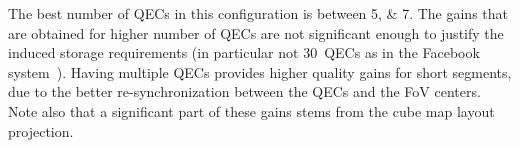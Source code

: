 The best number of \acp{QEC} in this configuration is between
\numlist{5;7}. The gains that are obtained for higher number of
\acp{QEC} are not significant enough to justify the induced storage
requirements (in particular not $30$~\acp{QEC} as in the Facebook
system~\cite{facebook}). Having multiple  \acp{QEC} provides higher
quality gains for short segments, due to the better re-synchronization
between the \acp{QEC} and the \ac{FoV} centers. Note also that a
significant part of these gains stems from the cube map layout
projection.
%

